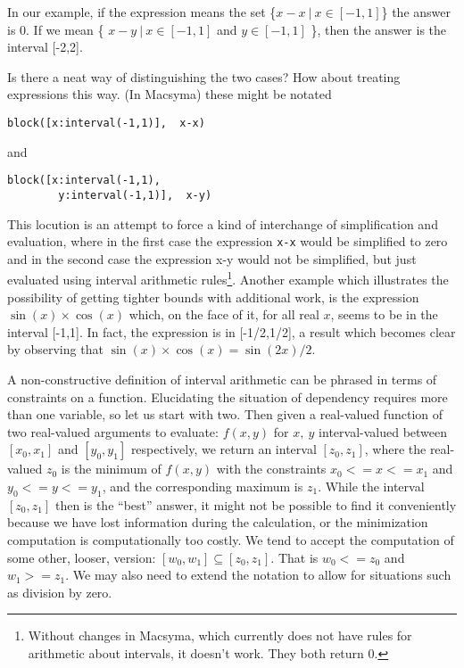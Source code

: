 \documentclass{article}
\begin{document}
In our example, if the expression means the set \{$x-x ~|~ x \in
[-1,1] $\} the answer is 0.  If we mean \{ $x-y ~|~ x \in [-1,1]$ and
$y \in [-1,1]$ \}, then the answer is the interval [-2,2].

Is there a neat way of distinguishing the two cases?  How
about treating expressions this way. (In Macsyma) these might be notated
\begin{verbatim}
block([x:interval(-1,1)],  x-x)
\end{verbatim}
and
\begin{verbatim}
block([x:interval(-1,1),
        y:interval(-1,1)],  x-y)
\end{verbatim}

This locution is an attempt to force a kind of interchange of
simplification and evaluation, where in the first case the expression
{\tt x-x} would be simplified to zero and in the second case the
expression x-y would not be simplified, but just evaluated using
interval arithmetic rules\footnote{Without changes in Macsyma, which
currently does not have rules for arithmetic about intervals, it
doesn't work. They both return 0.}.  Another example which illustrates
the possibility of getting tighter bounds with additional work, is the
expression $\sin(x) \times \cos(x)$ which, on the face of it, for all
real $x$, seems to be in the interval [-1,1].  In fact, the expression is in
[-1/2,1/2], a result which becomes clear by observing that $\sin(x)
\times \cos(x) = \sin(2x)/2$.

A non-constructive definition of interval arithmetic can be phrased in
terms of constraints on a function.  Elucidating the situation of
dependency requires more than one variable, so let us start with two.
Then given a real-valued function of two real-valued arguments to
evaluate: $f(x,y)$ for $x,~y$ interval-valued between $[x_0,x_1]$ and
$[y_0,y_1]$ respectively, we return an interval $[z_0,z_1]$, where the
real-valued $z_0$ is the minimum of $f(x,y)$ with the constraints $x_0
<= x <=x_1$ and $y_0 <= y <=y_1$, and the corresponding maximum is
$z_1$.  While the interval $[z_0,z_1]$ then is the ``best'' answer, it
might not be possible to find it conveniently because we have lost
information during the calculation, or the minimization computation is
computationally too costly. We tend to accept the computation of some other, looser,
version: $[w_0,w_1] \subseteq [z_0,z_1]$. That is $w_0 <= z_0$ and$ w_1
>= z_1$.  We may also need to extend the notation to allow for
situations such as division by zero.
\end{document}
